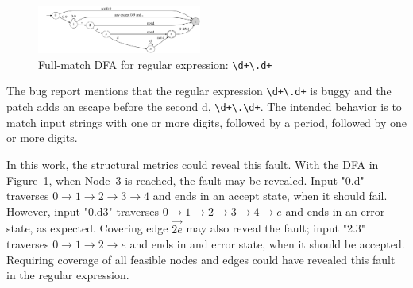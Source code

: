
\begin{figure}[t]
	\centering
	\includegraphics[width=0.48\textwidth]{figures/bug4}
	\vspace{-12pt}
	\caption{Full-match DFA for regular expression: {\tt \textbackslash d+\textbackslash .d+}}
	\label{fig:bug}    
	\vspace{-12pt}
\end{figure}

 The bug report mentions that the regular expression \verb!\d+\.d+! is buggy and the patch adds an escape before the second d, \verb!\d+\.\d+!. The intended behavior is to match input strings with one or more digits, followed by a period, followed by one or more digits.
 
In this work, the structural metrics could reveal this fault. 
With the DFA in Figure~\ref{fig:bug}, when Node~3 is reached, the fault may be revealed. 
Input "0.d" traverses $0 \rightarrow 1 \rightarrow 2 \rightarrow 3 \rightarrow 4$ and ends in an accept state, when it should fail. However, input "0.d3" traverses  $0 \rightarrow 1 \rightarrow 2 \rightarrow 3 \rightarrow 4 \rightarrow e$ and ends in an error state, as expected. 
Covering edge $\overrightarrow{2e}$ may also reveal the fault; input "2.3" traverses $0 \rightarrow 1 \rightarrow 2  \rightarrow e$ and ends in and error state, when it should be accepted.
Requiring coverage of all feasible nodes and edges could have revealed this fault in the regular expression. 

